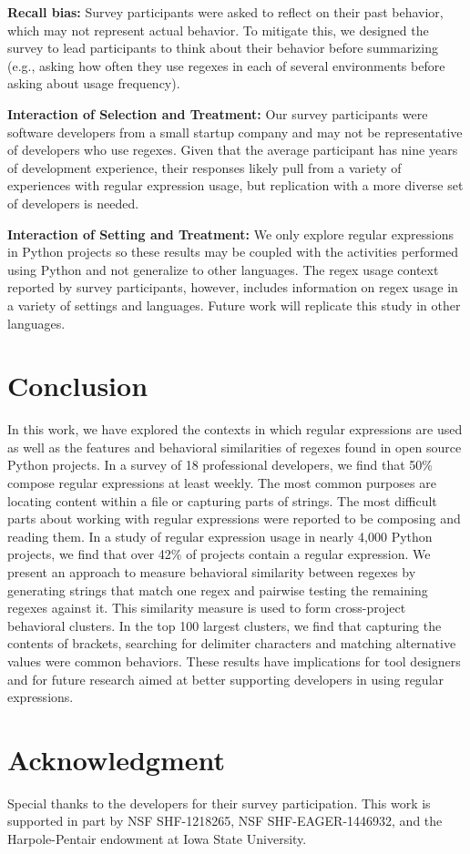 \documentclass{sig-alternate-05-2015}
\begin{document}
\textbf{Recall bias:} Survey participants were asked to reflect on their past behavior, which may not  represent actual behavior. To mitigate this, we designed the survey to lead participants to think about their behavior before summarizing (e.g., asking how often they use regexes in each of several environments before asking about usage frequency).

\textbf{Interaction of Selection and Treatment:} Our survey participants were software developers from a small startup company and may not be representative of developers who use regexes. Given that the average participant has nine years of development experience, their responses likely pull from a variety of experiences with regular expression usage, but replication with a more diverse set of developers is needed.

\textbf{Interaction of Setting and Treatment:}
We only explore regular expressions in Python projects so these results may be coupled with the activities performed using Python and not generalize to other languages. The regex usage context reported by survey participants, however, includes information on  regex usage in a  variety of settings and languages. Future work will replicate this study in other languages.

\section{Conclusion}
\label{sec:conclusion}
In this work, we have explored the contexts in which regular expressions are used as well as the features and behavioral similarities of regexes found in open source Python projects. In a survey of 18 professional developers, we find that 50\% compose regular expressions at least weekly. The most common purposes are locating content within a file or capturing parts of strings. The most difficult parts about working with regular expressions were reported to be composing and reading them.
In a study of regular expression usage in nearly 4,000 Python projects, we find that over 42\% of projects contain a regular expression.
We present an approach to measure behavioral similarity between regexes by generating strings that match one regex and pairwise  testing the remaining regexes against it. This similarity measure is used to form cross-project behavioral clusters. In the top 100 largest clusters, we find that capturing the contents of brackets,  searching for delimiter characters and matching alternative values were common behaviors.
These results have implications for tool designers and for future research aimed at better supporting developers in using regular expressions.

\section*{Acknowledgment}
Special thanks to the  developers for their survey participation.
This work is supported in part by NSF SHF-1218265, NSF SHF-EAGER-1446932, and the Harpole-Pentair endowment at Iowa State University.

\newpage

\balance

\end{document}
